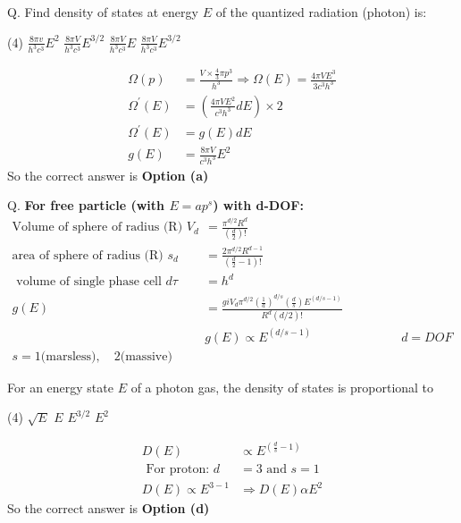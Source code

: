 Q. Find density of states at energy $E$ of the quantized radiation (photon) is:
 \begin{tasks}(4)
	\task[\textbf{a.}]$\frac{8 \pi v}{h^{3} c^{3}} E^{2}$
	\task[\textbf{b.}]$\frac{8 \pi V}{h^{3} c^{3}} E^{3 / 2}$
	\task[\textbf{c.}]$\frac{8 \pi V}{h^{3} c^{3}} E$
	\task[\textbf{d.}] $\frac{8 \pi V}{h^{3} c^{3}} E^{3 / 2}$
\end{tasks}
\begin{answer}
	\begin{align*}
	\Omega(p)&=\frac{V \times \frac{4}{3} \pi p^{3}}{h^{3}} \Rightarrow \Omega(E)=\frac{4 \pi V E^{3}}{3 c^{3} h^{3}}\\
	\Omega^{\prime}(E)&=\left(\frac{4 \pi V E^{2}}{c^{3} h^{3}} d E\right) \times 2\\
	\Omega^{\prime}(E)&=g(E) d E\\
	g(E)&=\frac{8 \pi V}{c^{3} h^{3}} E^{2}
	\end{align*}
	So the correct answer is \textbf{Option (a)}
\end{answer}
Q. \textbf{For free particle (with $E=ap^s$) with d-DOF: }\\
\begin{align*}
\text{Volume of sphere of radius (R) }V_{d}&=\frac{\pi^{d / 2} R^{d}}{\left(\frac{d}{2}\right) !}\\
\text{area of sphere of radius (R) }s_{d}&=\frac{2 \pi^{d / 2} R^{d-1}}{\left(\frac{d}{2}-1\right) !}\\
\text{ volume of single phase cell }d \tau&=h^{d}\\
g(E)&=\frac{g i V_{d} \pi^{d / 2}\left(\frac{1}{a}\right)^{d / s}\left(\frac{d}{s}\right) E^{(d / s-1)}}{R^{d}(d / 2) !}\\
&g(E) \propto E^{(d / s-1)}\hspace{3cm}d=DOF\\
s=1 \text{(marsless)},\quad
2 \text{(massive)}
\end{align*}
\begin{exercise}
	For an energy state $E$ of a photon gas, the density of states is proportional to 
\end{exercise}
 \begin{tasks}(4)
	\task[\textbf{a.}] $\sqrt{E}$
	\task[\textbf{b.}] $E $
	\task[\textbf{c.}]$E^{3 / 2}$
	\task[\textbf{d.}] $E^{2}$
\end{tasks}
\begin{answer}
	\begin{align*}
	D(E) &\propto E^{\left(\frac{d}{s}-1\right)}\\
	\text { For proton: } d&=3 \text { and } s=1\\
	D(E) \propto E^{3-1} &\Rightarrow D(E) \alpha E^{2}
	\end{align*}
		So the correct answer is \textbf{Option (d)}
\end{answer}
